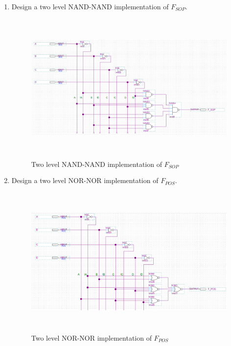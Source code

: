 \documentclass[CMPE]{KGCOEReport}
\begin{document}
\begin{enumerate}
  \item Design a two level NAND-NAND implementation of $F_{SOP}$.
  
\begin{figure}[htbp]
	\centering
	\includegraphics[height=7.5cm]{nand-nand}
	\caption{Two level NAND-NAND implementation of $F_{SOP}$}
	\label{fig:nand-nand}
\end{figure}

  \item Design a two level NOR-NOR implementation of $F_{POS}$.
  
\begin{figure}[htbp]
	\centering
	\includegraphics[height=7.5cm]{nor-nor}
	\caption{Two level NOR-NOR implementation of $F_{POS}$}
	\label{fig:nor-nor}
\end{figure}
\end{enumerate}
\end{document}
